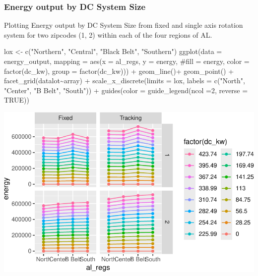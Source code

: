 \documentclass[
  letterpaper,
  DIV=11,
  numbers=noendperiod]{scrartcl}
\newenvironment{Shaded}{\begin{snugshade}}{\end{snugshade}}
\newcommand{\AttributeTok}[1]{\textcolor[rgb]{0.40,0.45,0.13}{#1}}
\newcommand{\CommentTok}[1]{\textcolor[rgb]{0.37,0.37,0.37}{#1}}
\newcommand{\ConstantTok}[1]{\textcolor[rgb]{0.56,0.35,0.01}{#1}}
\newcommand{\DecValTok}[1]{\textcolor[rgb]{0.68,0.00,0.00}{#1}}
\newcommand{\FunctionTok}[1]{\textcolor[rgb]{0.28,0.35,0.67}{#1}}
\newcommand{\NormalTok}[1]{\textcolor[rgb]{0.00,0.23,0.31}{#1}}
\newcommand{\OtherTok}[1]{\textcolor[rgb]{0.00,0.23,0.31}{#1}}
\newcommand{\SpecialCharTok}[1]{\textcolor[rgb]{0.37,0.37,0.37}{#1}}
\newcommand{\StringTok}[1]{\textcolor[rgb]{0.13,0.47,0.30}{#1}}
\begin{document}
\subsubsection{Energy output by DC System
Size}\label{energy-output-by-dc-system-size}

Plotting Energy output by DC System Size from fixed and single axis
rotation system for two zipcodes (1, 2) within each of the four regions
of AL.

\begin{Shaded}
\begin{Highlighting}[]
\NormalTok{lox }\OtherTok{\textless{}{-}} \FunctionTok{c}\NormalTok{(}\StringTok{"Northern"}\NormalTok{, }\StringTok{"Central"}\NormalTok{, }\StringTok{"Black Belt"}\NormalTok{, }\StringTok{"Southern"}\NormalTok{)}
\FunctionTok{ggplot}\NormalTok{(}\AttributeTok{data =}\NormalTok{ energy\_output,}
         \AttributeTok{mapping =} \FunctionTok{aes}\NormalTok{(}\AttributeTok{x =}\NormalTok{ al\_regs,}
                       \AttributeTok{y =}\NormalTok{ energy,}
                       \CommentTok{\#fill = energy,}
                       \AttributeTok{color =} \FunctionTok{factor}\NormalTok{(dc\_kw),}
                       \AttributeTok{group =} \FunctionTok{factor}\NormalTok{(dc\_kw))) }\SpecialCharTok{+}
  \FunctionTok{geom\_line}\NormalTok{()}\SpecialCharTok{+}
  \FunctionTok{geom\_point}\NormalTok{() }\SpecialCharTok{+}
  \FunctionTok{facet\_grid}\NormalTok{(datalot}\SpecialCharTok{\textasciitilde{}}\NormalTok{array) }\SpecialCharTok{+}
  \FunctionTok{scale\_x\_discrete}\NormalTok{(}\AttributeTok{limits =}\NormalTok{ lox,}
                   \AttributeTok{labels =} \FunctionTok{c}\NormalTok{(}\StringTok{"North"}\NormalTok{, }\StringTok{"Center"}\NormalTok{, }\StringTok{"B Belt"}\NormalTok{, }\StringTok{"South"}\NormalTok{)) }\SpecialCharTok{+}
  \FunctionTok{guides}\NormalTok{(}\AttributeTok{color =} \FunctionTok{guide\_legend}\NormalTok{(}\AttributeTok{ncol =}\DecValTok{2}\NormalTok{, }\AttributeTok{reverse =} \ConstantTok{TRUE}\NormalTok{))}
\end{Highlighting}
\end{Shaded}

\includegraphics{Simulation_files/figure-pdf/unnamed-chunk-17-1.pdf}
\end{document}
